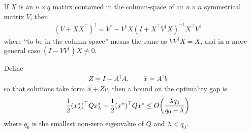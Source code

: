 \documentclass[12pt]{article}
\begin{document}
\begin{theorem}
  \label{thm:kovanic}
  If \(X\) is an \(n \times q\) matirx contained in the column-space
  of an \(n \times n\) symmetrical matrix \(V\), then
  \begin{align*}
    (V + X X^\top)^\dagger
      = V^\dagger
        - V ^\dagger X (I + X^\top V^\dagger X)^{-1} X^\top V^\dagger
  \end{align*}
  where ``to be in the column-space'' means the same as
  \(V V^\dagger X = X\),
  and in a more general case
  \((I - V V^\dagger)X \neq 0\).
\end{theorem}

\begin{theorem}
  Define
  \begin{align*}
    Z = I - A ^\dagger A,
      \qquad \hat{x} = A^\dagger b
  \end{align*}
  so that solutions take form \(\hat{x} + Z v\),
  then a bound on the optimality gap is
  \begin{align*}
    \frac{1}{2} (x_\lambda ^\star)^\top Q x_\lambda ^\star
      - \frac{1}{2} (x^\star)^\top Q x^\star
      \leq O{\left(\frac{\lambda q_0}{q_0 - \lambda}\right)}
  \end{align*}
  where \(q_0\) is the smallest non-zero eigenvalue of
  \(Q\) and \(\lambda < q_0\).
\end{theorem}
\end{document}
